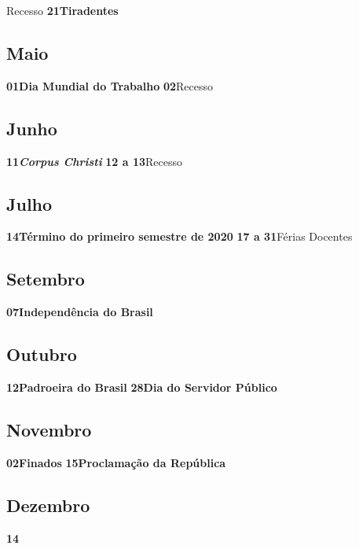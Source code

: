 \documentclass[thesis]{hmcposter}
\begin{document}
\begin{poster}
\quad \quad Recesso \newline\textbf{21}\quad \quad \quad \quad \textbf{Tiradentes} \newline\subsection{Maio}\textbf{01}\quad \quad \quad \quad \textbf{Dia Mundial do Trabalho} \newline\textbf{02}\quad \quad \quad \quad Recesso \newline\subsection{Junho}\textbf{11}\quad \quad \quad \quad \textbf{\textit{Corpus Christi}} \newline\textbf{12 a 13}\quad \quad Recesso \newline\subsection{Julho}\textbf{14}\quad \quad \quad \quad \textbf{Término do primeiro semestre de 2020} \newline\textbf{17 a 31}\quad \quad Férias Docentes \newline\subsection{Setembro}\textbf{07}\quad \quad \quad \quad \textbf{Independência do Brasil} \newline\subsection{Outubro}\textbf{12}\quad \quad \quad \quad \textbf{Padroeira do Brasil} \newline\textbf{28}\quad \quad \quad \quad \textbf{Dia do Servidor Público} \newline\subsection{Novembro}\textbf{02}\quad \quad \quad \quad \textbf{Finados} \newline\textbf{15}\quad \quad \quad \quad \textbf{Proclamação da República} \newline\subsection{Dezembro}\textbf{14}\quad \quad 
\end{poster}
\end{document}
